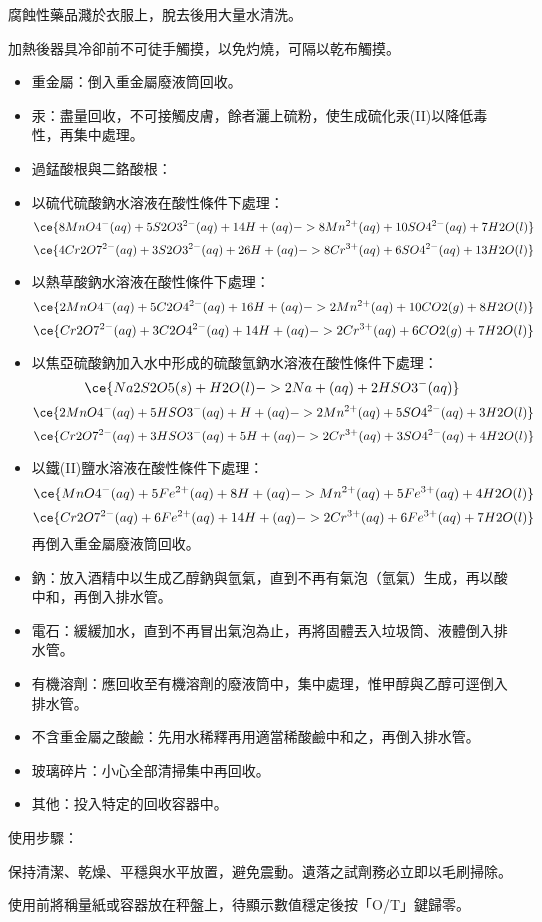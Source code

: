 \documentclass[a4paper,12pt]{article}
\begin{document}
\item 腐蝕性藥品濺於衣服上，脫去後用大量水清洗。
\item 加熱後器具冷卻前不可徒手觸摸，以免灼燒，可隔以乾布觸摸。
\eit
{}
\begin{itemize}
\item 重金屬：倒入重金屬廢液筒回收。
\item 汞：盡量回收，不可接觸皮膚，餘者灑上硫粉，使生成硫化汞(II)以降低毒性，再集中處理。
\item 過錳酸根與二鉻酸根：
\bit
\item 以硫代硫酸鈉水溶液在酸性條件下處理：
\[\ce{8MnO4^-(aq) + 5S2O3^{2-}(aq) + 14H+(aq) -> 8Mn^{2+}(aq) + 10SO4^{2-}(aq) + 7H2O(l)}\]
\[\ce{4Cr2O7^{2-}(aq) + 3S2O3^{2-}(aq) + 26H+(aq) -> 8Cr^{3+}(aq) + 6SO4^{2-}(aq) + 13H2O(l)}\]
\item 以熱草酸鈉水溶液在酸性條件下處理：
\[\ce{2MnO4^-(aq) + 5C2O4^{2-}(aq) + 16H+(aq) -> 2Mn^{2+}(aq) + 10CO2(g) + 8H2O(l)}\]
\[\ce{Cr2O7^{2-}(aq) + 3C2O4^{2-}(aq) + 14H+(aq) -> 2Cr^{3+}(aq) + 6CO2(g) + 7H2O(l)}\]
\item 以焦亞硫酸鈉加入水中形成的硫酸氫鈉水溶液在酸性條件下處理：
\[\ce{Na2S2O5(s) + H2O(l) -> 2Na+(aq) + 2HSO3^-(aq)}\]
\[\ce{2MnO4^-(aq) + 5HSO3^-(aq) + H+(aq) -> 2Mn^{2+}(aq) + 5SO4^{2-}(aq) + 3H2O(l)}\]
\[\ce{Cr2O7^{2-}(aq) + 3HSO3^-(aq) + 5H+(aq) -> 2Cr^{3+}(aq) + 3SO4^{2-}(aq) + 4H2O(l)}\]
\item 以鐵(II)鹽水溶液在酸性條件下處理：
\[\ce{MnO4^-(aq) + 5Fe^{2+}(aq) + 8H+(aq) -> Mn^{2+}(aq) + 5Fe^{3+}(aq) + 4H2O(l)}\]
\[\ce{Cr2O7^{2-}(aq) + 6Fe^{2+}(aq) + 14H+(aq) -> 2Cr^{3+}(aq) + 6Fe^{3+}(aq) + 7H2O(l)}\]
\eit
再倒入重金屬廢液筒回收。
\item 鈉：放入酒精中以生成乙醇鈉與氫氣，直到不再有氣泡（氫氣）生成，再以酸中和，再倒入排水管。
\item 電石：緩緩加水，直到不再冒出氣泡為止，再將固體丟入垃圾筒、液體倒入排水管。
\item 有機溶劑：應回收至有機溶劑的廢液筒中，集中處理，惟甲醇與乙醇可逕倒入排水管。
\item 不含重金屬之酸鹼：先用水稀釋再用適當稀酸鹼中和之，再倒入排水管。
\item 玻璃碎片：小心全部清掃集中再回收。
\item 其他：投入特定的回收容器中。
\end{itemize}
使用步驟：
\ben
\item 保持清潔、乾燥、平穩與水平放置，避免震動。遺落之試劑務必立即以毛刷掃除。
\item 使用前將稱量紙或容器放在秤盤上，待顯示數值穩定後按「O/T」鍵歸零。
\end{document}
